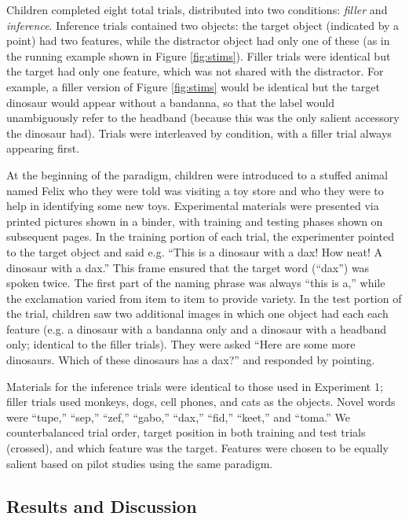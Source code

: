 \documentclass[man,noapacite]{apa2}
\begin{document}
Children completed eight total trials, distributed into two conditions: \emph{filler} and \emph{inference}. Inference trials contained two objects: the target object (indicated by a point) had two features, while the distractor object had only one of these (as in the running example shown in Figure \ref{fig:stims}). Filler trials were identical but the target had only one feature, which was not shared with the distractor. For example, a filler version of Figure \ref{fig:stims} would be identical but the target dinosaur would appear without a bandanna, so that the label would unambiguously refer to the headband (because this was the only salient accessory the dinosaur had). Trials were interleaved by condition, with a filler trial always appearing first. 

At the beginning of the paradigm, children were introduced to a stuffed animal named Felix who they were told was visiting a toy store and who they were to help in identifying some new toys. Experimental materials were presented via printed pictures shown in a binder, with training and testing phases shown on subsequent pages. In the training portion of each trial, the experimenter pointed to the target object and said e.g. ``This is a dinosaur with a dax! How neat! A dinosaur with a dax.'' This frame ensured that the target word (``dax'') was spoken twice. The first part of the naming phrase was always ``this is a,'' while the exclamation varied from item to item to provide variety. In the test portion of the trial, children saw two additional images in which one object had each each feature (e.g. a dinosaur with a bandanna only and a dinosaur with a headband only; identical to the filler trials). They were asked ``Here are some more dinosaurs. Which of these dinosaurs has a dax?'' and responded by pointing. 

Materials for the inference trials were identical to those used in Experiment 1; filler trials used monkeys, dogs, cell phones, and cats as the objects. Novel words were ``tupe,'' ``sep,'' ``zef,'' ``gabo,'' ``dax,'' ``fid,'' ``keet,'' and ``toma.'' We counterbalanced trial order, target position in both training and test trials (crossed), and which feature was the target. Features were chosen to be equally salient based on pilot studies using the same paradigm.


\subsection{Results and Discussion}
\end{document}
